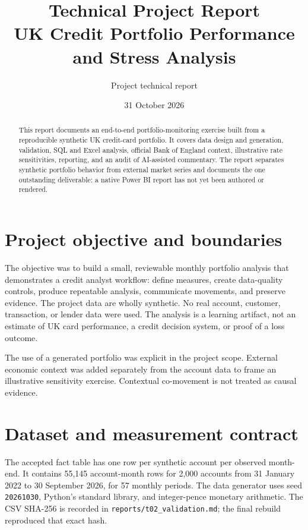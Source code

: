 \documentclass[11pt]{article}
\title{Technical Project Report\\[4pt]\large UK Credit Portfolio Performance and Stress Analysis}
\author{Project technical report}
\date{31 October 2026}
\begin{document}
\maketitle
\syntheticnotice
\begin{abstract}
This report documents an end-to-end portfolio-monitoring exercise built from a reproducible synthetic UK credit-card portfolio. It covers data design and generation, validation, SQL and Excel analysis, official Bank of England context, illustrative rate sensitivities, reporting, and an audit of AI-assisted commentary. The report separates synthetic portfolio behavior from external market series and documents the one outstanding deliverable: a native Power BI report has not yet been authored or rendered.
\end{abstract}
\tableofcontents
\newpage

\section{Project objective and boundaries}

The objective was to build a small, reviewable monthly portfolio analysis that demonstrates a credit analyst workflow: define measures, create data-quality controls, produce repeatable analysis, communicate movements, and preserve evidence. The project data are wholly synthetic. No real account, customer, transaction, or lender data were used. The analysis is a learning artifact, not an estimate of UK card performance, a credit decision system, or proof of a loss outcome.

The use of a generated portfolio was explicit in the project scope. External economic context was added separately from the account data to frame an illustrative sensitivity exercise. Contextual co-movement is not treated as causal evidence.

\section{Dataset and measurement contract}

The accepted fact table has one row per synthetic account per observed month-end. It contains 55,145 account-month rows for 2,000 accounts from 31 January 2022 to 30 September 2026, for 57 monthly periods. The data generator uses seed \texttt{20261030}, Python's standard library, and integer-pence monetary arithmetic. The CSV SHA-256 is recorded in \texttt{reports/t02\_validation.md}; the final rebuild reproduced that exact hash.
\end{document}
